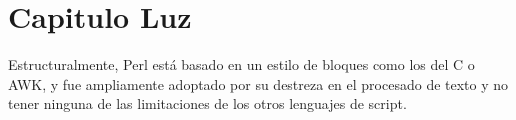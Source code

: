 \section{Capitulo Luz}
Estructuralmente, Perl está basado en un estilo de bloques como los del C o AWK, y fue ampliamente adoptado por su destreza en el procesado de texto y no tener ninguna de las limitaciones de los otros lenguajes de script.